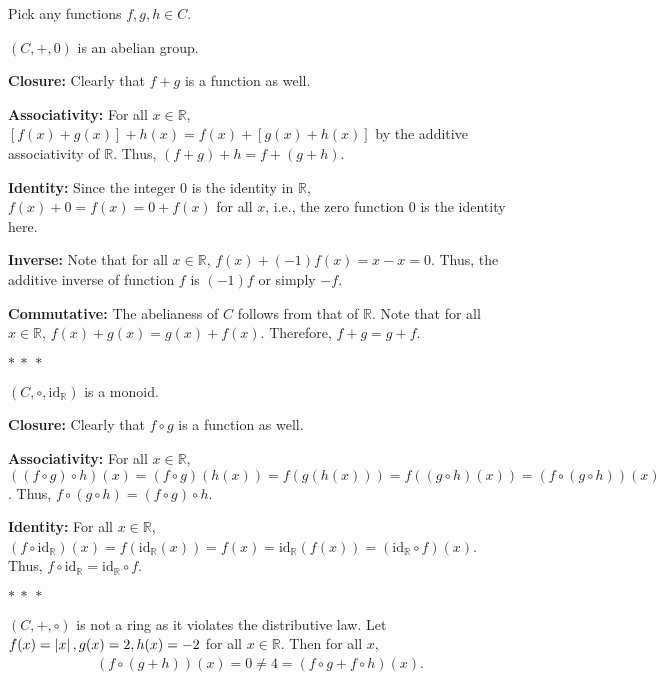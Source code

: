 \documentclass[12pt]{article}
\begin{document}
\begin{fproof}[Jacobson 2.1.1]
  Pick any functions \(f,g,h \in C\).

  \((C, +, 0)\) is an abelian group. 

  \textbf{Closure:}
  Clearly that \(f+g\) is a function as well.

  \textbf{Associativity:}
  For all \(x \in \mathbb{R}\),
  \([f(x) + g(x)] + h(x) = f(x) + [g(x) + h(x)]\) by the additive associativity of \(\mathbb{R}\). Thus, \((f + g) + h = f + (g + h)\).

  \textbf{Identity:}
  Since the integer 0 is the identity in \(\mathbb{R}\), \(f(x) + 0 = f(x) = 0 + f(x)\) for all \(x\), i.e., the zero function 0 is the identity here.

  \textbf{Inverse:}
  Note that for all \(x \in \mathbb{R}\), \(f(x) + (-1)f(x) = x - x = 0\). Thus, the additive inverse of function \(f\) is \((-1)f\) or simply \(-f\).

  \textbf{Commutative:}
  The abelianess of \(C\) follows from that of \(\mathbb{R}\). Note that for all \(x \in \mathbb{R}\), \(f(x) + g(x) = g(x) + f(x)\). Therefore, \(f + g = g + f\).

  \begin{center}
    \(\ast~\ast~\ast\)
  \end{center}

  \((C, \circ, \text{id}_{\mathbb{R}})\) is a monoid.

  \textbf{Closure:}
  Clearly that \(f \circ g\) is a function as well.

  \textbf{Associativity:}
  For all \(x \in \mathbb{R}\),
  \(((f \circ g) \circ h) (x)= (f \circ g)(h(x)) = f(g(h(x))) = f((g \circ h) (x)) = (f \circ (g \circ h)) (x)\).
  Thus, \(f \circ (g \circ h) = (f \circ g) \circ h\).

  \textbf{Identity:}
  For all \(x \in \mathbb{R}\), \((f \circ \text{id}_{\mathbb{R}}) (x) = f(\text{id}_{\mathbb{R}}(x)) = f(x) = \text{id}_{\mathbb{R}}(f(x)) = (\text{id}_{\mathbb{R}} \circ f)(x)\). Thus, \(f \circ \text{id}_{\mathbb{R}} = \text{id}_{\mathbb{R}} \circ f\).

  \begin{center}
    \(\ast~\ast~\ast\)
  \end{center}

  \((C, +, \circ)\) is not a ring as it violates the distributive law.
  Let \(f(x) = \left\lvert x \right\rvert, g(x) = 2, h(x) = -2\) for all \(x \in \mathbb{R}\).
  Then for all \(x\),
  \begin{align*}
    (f \circ (g + h))(x) = 0 \neq 4 = (f \circ g + f \circ h)(x).
  \end{align*}
\end{fproof}
\end{document}
